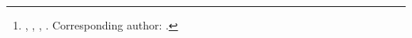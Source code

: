 \documentclass[journal]{IEEEtran}
\begin{document}
\title{\ssTitle}
\ifanonymous
  \author{Anonymous authors}
\else
  \def\ssSep{}
  \def\ssAuthor#1#2#3#4{\ssSep#1~#2\def\ssSep{, }}
  \author{\ssAuthorList\thanks{\ssDept, \ssOrg, \ssCity, \ssCountry.
    Corresponding author: \ssCorresponding.}}
\fi
\maketitle
\begin{abstract}

\end{abstract}
\begin{IEEEkeywords}

\end{IEEEkeywords}




\end{document}
